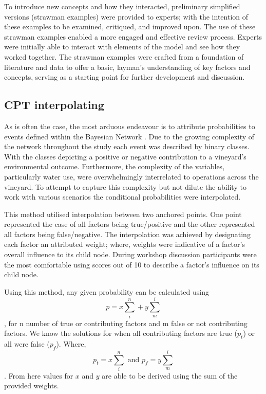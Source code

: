 To introduce new concepts and how they interacted, preliminary simplified versions (strawman examples) were provided to experts; with the intention of these examples to be examined, critiqued, and improved upon. The use of these strawman examples enabled a more engaged and effective review process. Experts were initially able to interact with elements of the model and see how they worked together. The strawman examples were crafted from a foundation of literature and data to offer a basic, layman's understanding of key factors and concepts, serving as a starting point for further development and discussion. 

\subsection{CPT interpolating}

As is often the case, the most arduous endeavour is to attribute probabilities to events defined within the Bayesian Network \citep{korbBayesianArtificialIntelligence2011}. Due to the growing complexity of the network throughout the study each event was described by binary classes. With the classes depicting a positive or negative contribution to a vineyard's environmental outcome. Furthermore, the complexity of the variables, particularly water use, were overwhelmingly interrelated to operations across the vineyard. To attempt to capture this complexity but not dilute the ability to work with various scenarios the conditional probabilities were interpolated.

This method utilised interpolation between two anchored points. One point represented the case of all factors being true/positive and the other represented all factors being false/negative. The interpolation was achieved by designating each factor an attributed weight; where, weights were indicative of a factor's overall influence to its child node. During workshop discussion participants were the most comfortable using scores out of 10 to describe a factor's influence on its child node.

Using this method, any given probability can be calculated using
\begin{equation}
        p=x\sum_{i}^{n} + y\sum_{m}^{i} 
\end{equation},
for n number of true or contributing factors and m false or not contributing factors. We know the solutions for when all contributing factors are true ($p_t$) or all were false ($p_f$). Where,
\begin{equation}
        p_t=x\sum_{i}^{n} 
        \text{ and }
        p_f=y\sum_{m}^{i}
\end{equation}.
From here values for $x$ and $y$ are able to be derived using the sum of the provided weights.

